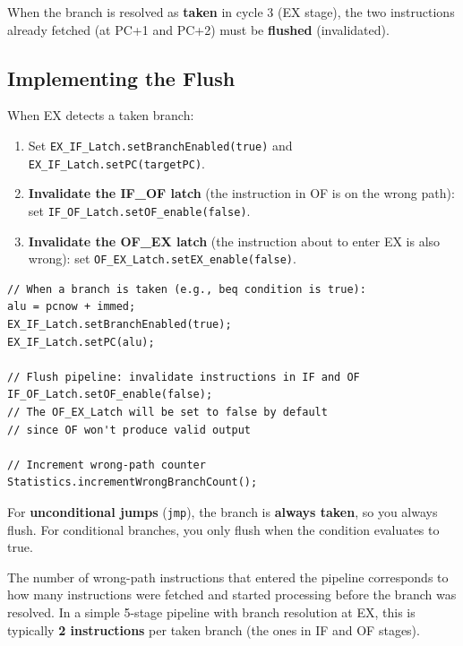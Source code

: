\documentclass[12pt,a4paper]{article}
\begin{document}
When the branch is resolved as \textbf{taken} in cycle 3 (EX stage), the two instructions already fetched (at PC+1 and PC+2) must be \textbf{flushed} (invalidated).

\subsection{Implementing the Flush}

When EX detects a taken branch:

\begin{enumerate}
    \item Set \texttt{EX\_IF\_Latch.setBranchEnabled(true)} and \texttt{EX\_IF\_Latch.setPC(targetPC)}.
    \item \textbf{Invalidate the IF\_OF latch} (the instruction in OF is on the wrong path): set \texttt{IF\_OF\_Latch.setOF\_enable(false)}.
    \item \textbf{Invalidate the OF\_EX latch} (the instruction about to enter EX is also wrong): set \texttt{OF\_EX\_Latch.setEX\_enable(false)}.
\end{enumerate}

\begin{lstlisting}[style=javastyle, caption={Branch handling in EX stage}]
// When a branch is taken (e.g., beq condition is true):
alu = pcnow + immed;
EX_IF_Latch.setBranchEnabled(true);
EX_IF_Latch.setPC(alu);

// Flush pipeline: invalidate instructions in IF and OF
IF_OF_Latch.setOF_enable(false);
// The OF_EX_Latch will be set to false by default
// since OF won't produce valid output

// Increment wrong-path counter
Statistics.incrementWrongBranchCount();
\end{lstlisting}

\begin{keypoint}
For \textbf{unconditional jumps} (\texttt{jmp}), the branch is \textbf{always taken}, so you always flush. For conditional branches, you only flush when the condition evaluates to true.
\end{keypoint}

\begin{tipbox}
The number of wrong-path instructions that entered the pipeline corresponds to how many instructions were fetched and started processing before the branch was resolved. In a simple 5-stage pipeline with branch resolution at EX, this is typically \textbf{2 instructions} per taken branch (the ones in IF and OF stages).
\end{tipbox}
\end{document}
